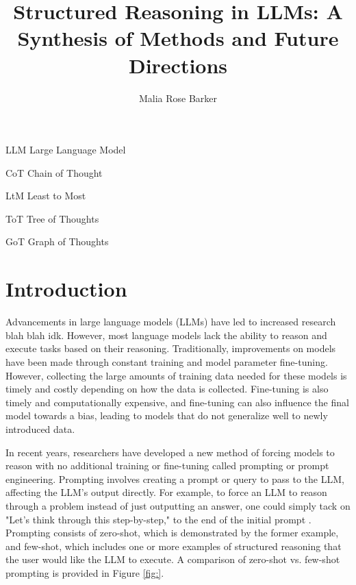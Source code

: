 \documentclass[project]{bsu-cs}  %
\title{Structured Reasoning in LLMs: A Synthesis of Methods and Future Directions}
\author{Malia Rose Barker}
\begin{document}
\frontmatter  %
% 
\buildFrontPages %
% 
\begin{listAbbreviations}
  \item[LLM] Large Language Model
  \item[CoT] Chain of Thought
  \item[LtM] Least to Most
  \item[ToT] Tree of Thoughts
  \item[GoT] Graph of Thoughts
\end{listAbbreviations}
% 
% 
\mainmatter
% 
%
%
% 
\chapter{Introduction} \label{ch:intro}
Advancements in large language models (LLMs) have led to increased research blah blah idk. However, most language models lack the ability to reason and execute tasks based on their reasoning. Traditionally, improvements on models have been made through constant training and model parameter fine-tuning. However, collecting the large amounts of training data needed for these models is timely and costly depending on how the data is collected. Fine-tuning is also timely and computationally expensive, and fine-tuning can also influence the final model towards a bias, leading to models that do not generalize well to newly introduced data. 

In recent years, researchers have developed a new method of forcing models to reason with no additional training or fine-tuning called prompting or prompt engineering. Prompting involves creating a prompt or query to pass to the LLM, affecting the LLM's output directly. For example, to force an LLM to reason through a problem instead of just outputting an answer, one could simply tack on "Let's think through this step-by-step," to the end of the initial prompt \citep{kojima2023largelanguagemodelszeroshot}. Prompting consists of zero-shot, which is demonstrated by the former example, and few-shot, which includes one or more examples of structured reasoning that the user would like the LLM to execute. A comparison of zero-shot vs. few-shot prompting is provided in Figure \ref{fig:}.
\end{document}
